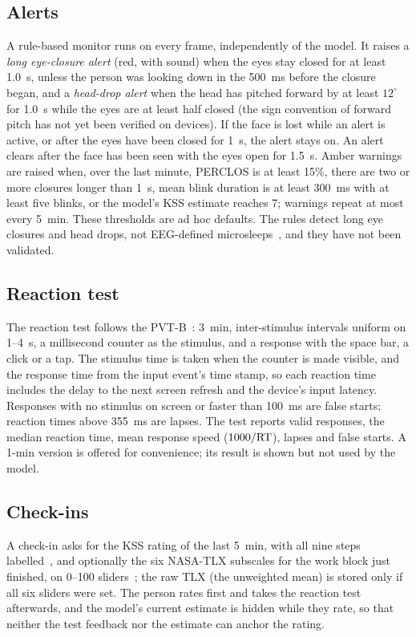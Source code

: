 \subsection{Alerts}
A rule-based monitor runs on every frame, independently of the model. It raises a \emph{long eye-closure alert} (red, with sound) when the eyes stay closed for at least 1.0~s, unless the person was looking down in the 500~ms before the closure began, and a \emph{head-drop alert} when the head has pitched forward by at least $12^\circ$ for 1.0~s while the eyes are at least half closed (the sign convention of forward pitch has not yet been verified on devices). If the face is lost while an alert is active, or after the eyes have been closed for 1~s, the alert stays on. An alert clears after the face has been seen with the eyes open for 1.5~s. Amber warnings are raised when, over the last minute, PERCLOS is at least 15\%, there are two or more closures longer than 1~s, mean blink duration is at least 300~ms with at least five blinks, or the model's KSS estimate reaches 7; warnings repeat at most every 5~min. These thresholds are ad hoc defaults. The rules detect long eye closures and head drops, not EEG-defined microsleeps~\cite{hertig2020microsleep}, and they have not been validated.

\subsection{Reaction test}
The reaction test follows the PVT-B~\cite{basner2011validity}: 3~min, inter-stimulus intervals uniform on 1--4~s, a millisecond counter as the stimulus, and a response with the space bar, a click or a tap. The stimulus time is taken when the counter is made visible, and the response time from the input event's time stamp, so each reaction time includes the delay to the next screen refresh and the device's input latency. Responses with no stimulus on screen or faster than 100~ms are false starts; reaction times above 355~ms are lapses. The test reports valid responses, the median reaction time, mean response speed ($1000/\mathrm{RT}$), lapses and false starts. A 1-min version is offered for convenience; its result is shown but not used by the model.

\subsection{Check-ins}
A check-in asks for the KSS rating of the last 5~min, with all nine steps labelled~\cite{akerstedt1990subjective,miley2016comparing}, and optionally the six NASA-TLX subscales for the work block just finished, on 0--100 sliders~\cite{hart1988development}; the raw TLX (the unweighted mean) is stored only if all six sliders were set. The person rates first and takes the reaction test afterwards, and the model's current estimate is hidden while they rate, so that neither the test feedback nor the estimate can anchor the rating.

